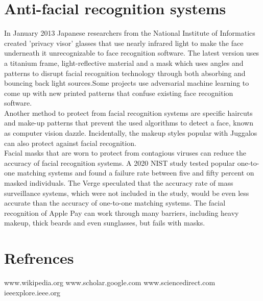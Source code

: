 \documentclass[12pt,letterpaper, onecolumn]{exam}
\begin{document}
\section{Anti-facial recognition systems}
In January 2013 Japanese researchers from the National Institute of Informatics created 'privacy visor' glasses that use nearly infrared light to make the face underneath it unrecognizable to face recognition software. The latest version uses a titanium frame, light-reflective material and a mask which uses angles and patterns to disrupt facial recognition technology through both absorbing and bouncing back light sources.Some projects use adversarial machine learning to come up with new printed patterns that confuse existing face recognition software.\\
Another method to protect from facial recognition systems are specific haircuts and make-up patterns that prevent the used algorithms to detect a face, known as computer vision dazzle. Incidentally, the makeup styles popular with Juggalos can also protect against facial recognition.
\\
Facial masks that are worn to protect from contagious viruses can reduce the accuracy of facial recognition systems. A 2020 NIST study tested popular one-to-one matching systems and found a failure rate between five and fifty percent on masked individuals. The Verge speculated that the accuracy rate of mass surveillance systems, which were not included in the study, would be even less accurate than the accuracy of one-to-one matching systems. The facial recognition of Apple Pay can work through many barriers, including heavy makeup, thick beards and even sunglasses, but fails with masks.
    
\section{Refrences}
www.wikipedia.org
www.scholar.google.com
www.sciencedirect.com
ieeexplore.ieee.org
\end{document}
